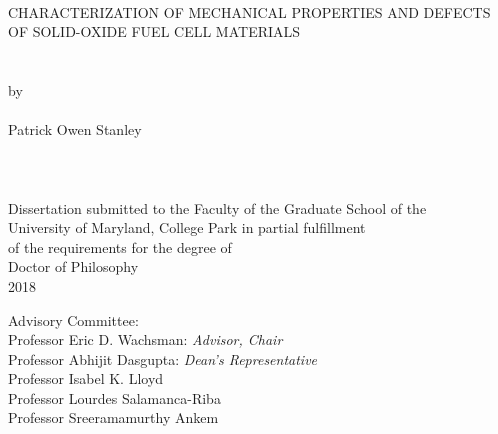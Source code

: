 
\thispagestyle{empty}
\hbox{\ }
\vspace{1in}
\renewcommand{\baselinestretch}{1}
\small\normalsize
\begin{center}

\large{{CHARACTERIZATION OF MECHANICAL PROPERTIES AND DEFECTS OF SOLID-OXIDE FUEL CELL MATERIALS}}\\
\ \\
\ \\
\large{by} \\
\ \\
\large{Patrick Owen Stanley}%
\ \\
\ \\
\ \\
\ \\
\normalsize
Dissertation submitted to the Faculty of the Graduate School of the \\
University of Maryland, College Park in partial fulfillment \\
of the requirements for the degree of \\
Doctor of Philosophy \\
2018
\end{center}

\vspace{7.5em}

\noindent Advisory Committee: \\
Professor Eric D. Wachsman: \textit{Advisor, Chair} \\
Professor Abhijit Dasgupta: \textit{Dean's Representative} \\
Professor Isabel K. Lloyd \\
Professor Lourdes Salamanca-Riba \\
Professor Sreeramamurthy Ankem
